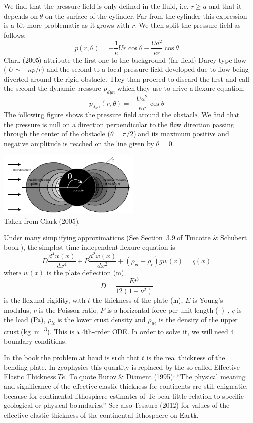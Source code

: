 We find that the pressure field is only defined in the fluid, i.e. $r\geq a$ and that it depends on $\theta$ on the surface of the cylinder. Far from the cylinder this expression is a bit more problematic as it grows with $r$. We then split the pressure field as follows:
\[
p(r,\theta) = 
-\frac{1}{\kappa} U r  \cos \theta
 -\frac{U a^2 }{\kappa r}  \cos \theta
\]
Clark \etal (2005) attribute the first one to the background (far-field) Darcy-type flow ( $U \sim - \kappa p/r$) and the second to a local pressure field developed
due to flow being diverted around the rigid obstacle. They 
then proceed to discard the first and call the second the dynamic pressure $p_{dyn}$ which they use to drive a flexure equation. 
\[
p_{dyn}(r,\theta) = -\frac{U a^2 }{\kappa r}  \cos \theta
\]
The following figure shows the pressure field around the obstacle.
We find that the pressure is null on a direction perpendicular to the flow direction passing through the center of the obstacle ($\theta=\pi/2$) and its maximum positive and negative amplitude is reached on the line given by $\theta=0$.
\begin{center}
\includegraphics[width=7cm]{python_codes/fieldstone_108/images/clbr05b}\\
{\captionfont 
Taken from Clark \etal (2005). }
\end{center}

Under many simplifying approximations (See Section~3.9 of Turcotte \& Schubert book \cite{tusc}), 
the simplest time-independent flexure equation is
\[
D \frac{d^4w(x)}{dx^4} + P \frac{d^2w(x)}{dx^2} + (\rho_m-\rho_c)g w(x) = q(x)
\]
where $w(x)$ is the plate deflection (\si{m}), 
\[
D=\frac{E t^3}{12(1-\nu^2)}
\]
is the flexural rigidity, with $t$ the thickness of the plate (\si{m}), 
$E$ is Young's modulus, $\nu$ is the Poisson ratio, 
$P$ is a horizontal force per unit length (\si{\kg\per\square\metre\square\sec}),  
$q$ is the load (\si{\pascal}), 
$\rho_{lc}$ is the lower crust density and $\rho_{uc}$ is the density of the upper crust (\si{\kg\per\cubic\metre}).
This is a 4th-order ODE. In order to solve it, we will need 4 boundary conditions.

In the book the problem at hand is such that $t$ is the real thickness of the bending plate. 
In geophysics this quantity is replaced by the so-called Effective Elastic Thickness $T\!e$.
To quote Burov \& Diament (1995): ``The physical meaning and significance of the effective elastic thickness
for continents are still enigmatic, because for continental lithosphere estimates of Te bear little 
relation to specific geological or physical boundaries.'' 
See also Tesauro \etal (2012) \cite{teak12} for values of the effective elastic thickness of the continental lithosphere
on Earth.

